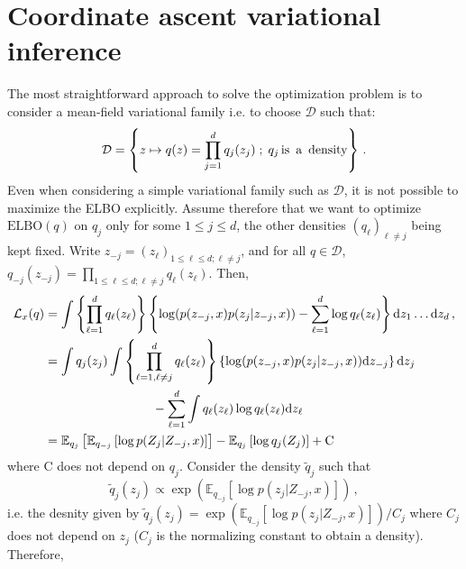 \documentclass[english,graybox,envcountchap,envcountsame,sectrefs,shortlabels]{svmono}
\theoremstyle{style}
\begin{document}
\section{Coordinate ascent variational inference}
The most straightforward approach to solve the optimization problem is to consider a mean-field variational family  i.e. to choose $\mathcal{D}$ such that: 
$$
\mathcal{D} = \left\{z\mapsto q(z) = \prod_{j=1}^dq_j(z_j)\;;\; q_j \,\mbox{is\, a\, density} \right\}\,.
$$
Even when considering a simple variational family such as $\mathcal{D}$, it is not possible to maximize the ELBO explicitly. Assume therefore that we want to optimize $\mathrm{ELBO}(q) $ on $q_j$ only for some $1\leq j \leq d$, the other densities $(q_\ell)_{\ell\neq j}$ being kept fixed.
Write $z_{-j} = (z_\ell)_{1\leq \ell \leq d; \ell \neq j}$, and for all $q\in \mathcal{D}$,  $q_{-j}(z_{-j}) = \prod_{1\leq \ell \leq d; \ell \neq j}q_{\ell}(z_{\ell})$. Then,
\begin{align*}
\mathcal{L}_x(q) &= \int \left\{\prod_{\ell=1}^dq_\ell(z_\ell)\right\} \left\{\log (p(z_{-j},x)p(z_j|z_{-j},x)) - \sum_{\ell=1}^d\log q_\ell(z_\ell)\right\}\rmd z_1\ldots \rmd z_d\,,\\
&= \int q_j(z_j)\int \left\{\prod_{\ell=1, \ell\neq j}^dq_\ell(z_\ell)\right\} \left\{\log (p(z_{-j},x)p(z_j|z_{-j},x))\rmd z_{-j}\right\}\rmd z_j \\
&\hspace{3cm}- \sum_{\ell=1}^d\int q_\ell(z_\ell)\log q_\ell(z_\ell)\rmd z_\ell  \,\\
&= \mathbb{E}_{q_j}\left[\mathbb{E}_{q_{-j}}\left[\log p(Z_j | Z_{-j},x)\right]\right] - \mathbb{E}_{q_j}\left[\log q_j(Z_j)\right]  + \mathrm{C}
\end{align*}
where $\mathrm{C}$ does not depend on $q_j$. %
Consider the density $\tilde q_j$ such that
$$
\tilde q_j(z_j) \propto \exp\left(\mathbb{E}_{q_{-j}}\left[\log p(z_j | Z_{-j},x)\right]\right)\,,
$$
i.e. the desnity given by $\tilde q_j(z_j)= \exp(\mathbb{E}_{q_{-j}}[\log p(z_j | Z_{-j},x)])/C_j$ where $C_j$ does not depend on $z_j$ ($C_j$ is the normalizing constant to obtain a density). Therefore,
\end{document}
